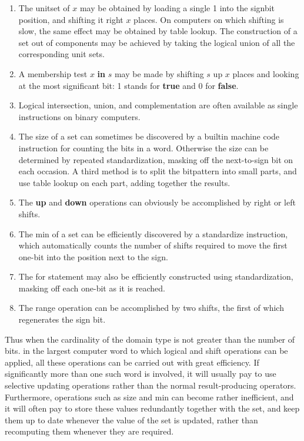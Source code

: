 \begin{enumerate}[wide, nosep, label=(\arabic*)]
	\item The unitset of $x$ may be obtained by loading a single 1 into the signbit position, and shifting it right $x$ places. On computers on which shifting is slow, the same effect may be obtained by table lookup. The construction of a set out of components may be achieved by taking the logical union of all the corresponding unit sets.

	\item A membership test $x$ \textbf{in} $s$ may be made by shifting $s$ up $x$ places and looking at the most significant bit: 1 stands for \textbf{true} and 0 for \textbf{false}.

	\item Logical intersection, union, and complementation are often available as single instructions on binary computers.

	\item The size of a set can sometimes be discovered by a builtin machine code instruction for counting the bits in a word. Otherwise the size can be determined by repeated standardization, masking off the next-to-sign bit on each occasion. A third method is to split the bitpattern into small parts, and use table lookup on each part, adding together the results.

	\item The \textbf{up} and \textbf{down} operations can obviously be accomplished by right or left shifts.

	\item The min of a set can be efficiently discovered by a standardize instruction, which automatically counts the number of shifts required to move the first one-bit into the position next to the sign.

	\item The for statement may also be efficiently constructed using standardization, masking off each one-bit as it is reached.

	\item The range operation can be accomplished by two shifts, the first of which regenerates the sign bit.	
\end{enumerate}

Thus when the cardinality of the domain type is not greater than the number of bits. in the largest computer word to which logical and shift operations can be applied, all these operations can be carried out with great efficiency. If significantly more than one such word is involved, it will usually pay to use selective updating operations rather than the normal result-producing operators. Furthermore, operations such as size and min can become rather inefficient, and it will often pay to store these values redundantly together with the set, and keep them up to date whenever the value of the set is updated, rather than recomputing them whenever they are required.

